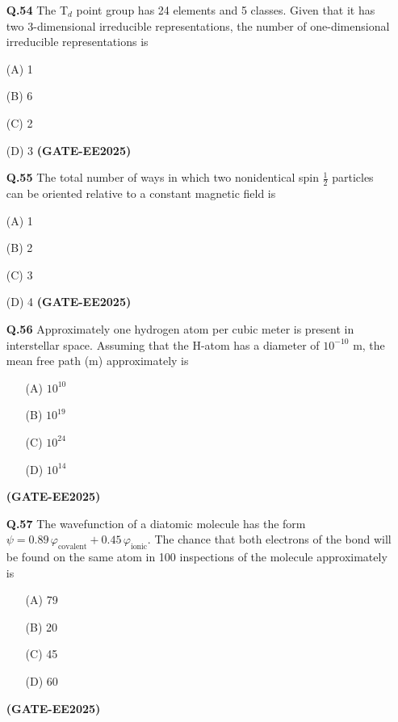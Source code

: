 \documentclass[12pt]{article}
\begin{document}
\begin{enumerate}
\textbf{Q.54} The T$_d$ point group has 24 elements and 5 classes. Given that it has two 3-dimensional irreducible representations, the number of one-dimensional irreducible representations is

\item[(A)] 1
\item[(B)] 6
\item[(C)] 2
\item[(D)] 3   \textbf{(GATE-EE2025)}


\vspace{0.5cm}

\textbf{Q.55} The total number of ways in which two nonidentical spin $\frac{1}{2}$ particles can be oriented relative to a constant magnetic field is

\item[(A)] 1
\item[(B)] 2
\item[(C)] 3
\item[(D)] 4   \textbf{(GATE-EE2025)}


\textbf{Q.56} Approximately one hydrogen atom per cubic meter is present in interstellar space. Assuming that the H-atom has a diameter of $10^{-10}$ m, the mean free path (m) approximately is

\begin{enumerate}
\item[(A)] $10^{10}$
\item[(B)] $10^{19}$
\item[(C)] $10^{24}$
\item[(D)] $10^{14}$
\end{enumerate}   \textbf{(GATE-EE2025)}


\vspace{0.5cm}

\textbf{Q.57} The wavefunction of a diatomic molecule has the form $\psi = 0.89\, \varphi_{\text{covalent}} + 0.45\, \varphi_{\text{ionic}}$. The chance that both electrons of the bond will be found on the same atom in 100 inspections of the molecule approximately is

\begin{enumerate}
\item[(A)] 79
\item[(B)] 20
\item[(C)] 45
\item[(D)] 60
\end{enumerate}   \textbf{(GATE-EE2025)}


\vspace{0.5cm}


\end{enumerate}
\end{document}
